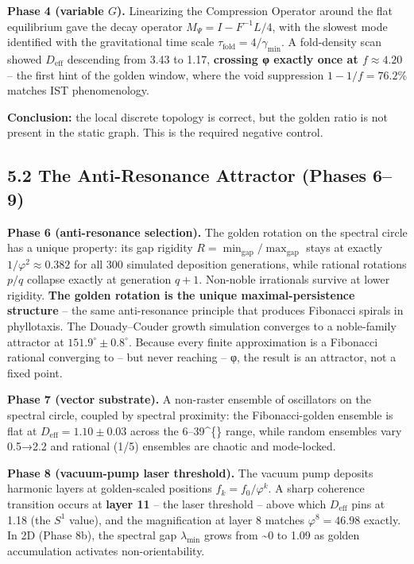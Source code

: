 \documentclass[
  11pt,
]{article}
\begin{document}
\textbf{Phase 4 (variable \(G\)).} Linearizing the Compression Operator
around the flat equilibrium gave the decay operator
\(M_\Psi = I - F^{-1}L/4\), with the slowest mode identified with the
gravitational time scale \(\tau_{\text{fold}} = 4/\gamma_{\min}\). A
fold-density scan showed \(D_{\text{eff}}\) descending from 3.43 to
1.17, \textbf{crossing φ exactly once at \(f \approx 4.20\)} -- the
first hint of the golden window, where the void suppression
\(1 - 1/f = 76.2\%\) matches IST phenomenology.

\textbf{Conclusion:} the local discrete topology is correct, but the
golden ratio is not present in the static graph. This is the required
negative control.

\subsection{5.2 The Anti-Resonance Attractor (Phases
6--9)}\label{the-anti-resonance-attractor-phases-69}

\textbf{Phase 6 (anti-resonance selection).} The golden rotation on the
spectral circle has a unique property: its gap rigidity
\(R = \min_{\text{gap}}/\max_{\text{gap}}\) stays at exactly
\(1/\varphi^2 \approx 0.382\) for all 300 simulated deposition
generations, while rational rotations \(p/q\) collapse exactly at
generation \(q + 1\). Non-noble irrationals survive at lower rigidity.
\textbf{The golden rotation is the unique maximal-persistence structure}
-- the same anti-resonance principle that produces Fibonacci spirals in
phyllotaxis. The Douady--Couder growth simulation converges to a
noble-family attractor at \(151.9^{\circ} \pm 0.8^{\circ}\). Because
every finite approximation is a Fibonacci rational converging to -- but
never reaching -- φ, the result is an attractor, not a fixed point.

\textbf{Phase 7 (vector substrate).} A non-raster ensemble of
oscillators on the spectral circle, coupled by spectral proximity: the
Fibonacci-golden ensemble is flat at \(D_{\text{eff}} = 1.10 \pm 0.03\)
across the 6--39\^{}\{\circ\} range, while random ensembles vary 0.5→2.2
and rational (1/5) ensembles are chaotic and mode-locked.

\textbf{Phase 8 (vacuum-pump laser threshold).} The vacuum pump deposits
harmonic layers at golden-scaled positions \(f_k = f_0/\varphi^k\). A
sharp coherence transition occurs at \textbf{layer 11} -- the laser
threshold -- above which \(D_{\text{eff}}\) pins at 1.18 (the \(S^1\)
value), and the magnification at layer 8 matches \(\varphi^8 = 46.98\)
exactly. In 2D (Phase 8b), the spectral gap \(\lambda_{\min}\) grows
from \textasciitilde0 to 1.09 as golden accumulation activates
non-orientability.
\end{document}

